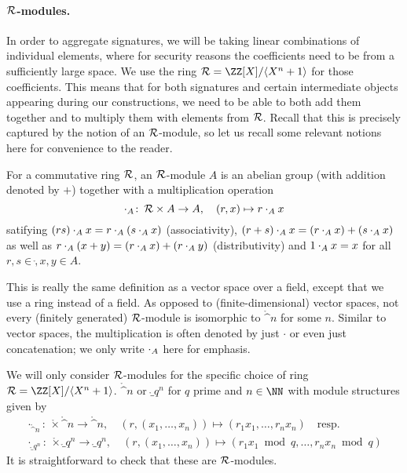 \paragraph{$\mathcal{R}$-modules.}
In order to aggregate signatures, we will be taking linear combinations of individual elements, where for security reasons the coefficients need to be from a sufficiently large space. We use the ring $\ring = \defring$ for those coefficients. This means that for both signatures and certain intermediate objects appearing during our constructions, we need to be able to both add them together and to multiply them with elements from $\mathcal{R}$. Recall that this is precisely captured by the notion of an $\mathcal{R}$-module, so let us recall some relevant notions here for convenience to the reader. 
\begin{definition}
For a commutative ring $\mathcal{R}$, an $\mathcal{R}$-module $A$ is an abelian group (with addition denoted by $+$) together with a multiplication operation
\[
 \mathbin{\cdot_A}\colon\,\mathcal{R}\times A \to A,\quad (r, x)\mapsto r\mathbin{\cdot_A} x
\]
satifying $(rs)\mathbin{\cdot_A} x = r\mathbin{\cdot_A} (s\mathbin{\cdot_A} x)$ (associativity), $(r+s)\mathbin{\cdot_A} x = (r\mathbin{\cdot_A} x) + (s\mathbin{\cdot_A} x)$ as well as $r\mathbin{\cdot_A}(x + y) = (r\mathbin{\cdot_A} x) + (r\mathbin{\cdot_A} y)$ (distributivity) and $1\mathbin{\cdot_A} x = x$ for all $r,s\in\ring, x,y\in A$.
\end{definition}
This is really the same definition as a vector space over a field, except that we use a ring instead of a field. As opposed to (finite-dimensional) vector spaces, not every (finitely generated) $\mathcal{R}$-module is isomorphic to $\ring^n$ for some $n$. Similar to vector spaces, the multiplication is often denoted by just $\cdot$ or even just concatenation; we only write $\mathbin{\cdot_A}$ here for emphasis.

We will only consider $\mathcal{R}$-modules for the specific choice of ring $\ring = \defring$.  $\ring^n$ or $\ring_q^n$ for $q$ prime and $n\in\NN$ with module structures given by
\begin{align*}
 \cdot_{\ring^n}\colon\, \ring \times \ring^n \to \ring^n, \quad (r,(x_1,\ldots, x_n))\mapsto (r_1x_1,\ldots,r_nx_n)\quad\text{resp.}\\
 \cdot_{\ring_q^n}\colon\, \ring \times \ring_q^n \to \ring_q^n,\quad (r,(x_1,\ldots, x_n)) \mapsto (r_1x_1\bmod q,\ldots, r_nx_n\bmod q)
\end{align*}
It is straightforward to check that these are $\mathcal{R}$-modules.

